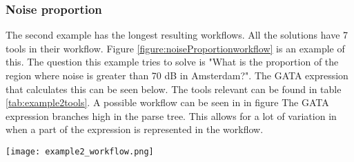 \documentclass{article}
\begin{document}
\subsubsection{Noise proportion}
The second example has the longest resulting workflows. All the solutions have 7 tools in their workflow. Figure \ref{figure:noiseProportionworkflow} is an example of this. The question this example tries to solve is "What is the proportion of the region where noise is greater than 70 dB in Amsterdam?". The GATA expression that calculates this can be seen below. The tools relevant can be found in table \ref{tab:example2tools}. A possible workflow can be seen in in figure
The GATA expression branches high in the parse tree.  This allows for a lot of variation in when a part of the expression is represented in the workflow. 

\begin{sidewaysfigure}
  \centering
    \texttt{[image: example2\_workflow.png]}
    \caption{The given workflow for the noise proportion example }
    \label{figure:noiseProportionworkflow}
\end{sidewaysfigure}
\end{document}
